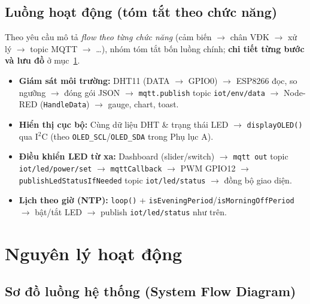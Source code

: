\documentclass[13pt,a4paper]{article}
\newcommand{\code}[1]{\texttt{#1}}
\begin{document}
\subsection{Luồng hoạt động (tóm tắt theo chức năng)}
\label{sec:tomtatluong-thietke}

Theo yêu cầu mô tả \textit{flow theo từng chức năng} (cảm biến $\rightarrow$ chân VĐK $\rightarrow$ xử lý $\rightarrow$ topic MQTT $\rightarrow$ \ldots), nhóm tóm tắt bốn luồng chính; \textbf{chi tiết từng bước và lưu đồ} ở mục~\ref{sec:nguyenly}.

\begin{itemize}
    \item \textbf{Giám sát môi trường:} DHT11 (DATA $\rightarrow$ GPIO0) $\rightarrow$ ESP8266 đọc, so ngưỡng $\rightarrow$ đóng gói JSON $\rightarrow$ \code{mqtt.publish} topic \code{iot/env/data} $\rightarrow$ Node-RED (\code{HandleData}) $\rightarrow$ gauge, chart, toast.
    \item \textbf{Hiển thị cục bộ:} Cùng dữ liệu DHT \& trạng thái LED $\rightarrow$ \code{displayOLED()} qua I$^2$C (theo \code{OLED\_SCL}/\code{OLED\_SDA} trong Phụ lục A).
    \item \textbf{Điều khiển LED từ xa:} Dashboard (slider/switch) $\rightarrow$ \code{mqtt out} topic \code{iot/led/power/set} $\rightarrow$ \code{mqttCallback} $\rightarrow$ PWM GPIO12 $\rightarrow$ \code{publishLedStatusIfNeeded} topic \code{iot/led/status} $\rightarrow$ đồng bộ giao diện.
    \item \textbf{Lịch theo giờ (NTP):} \code{loop()} + \code{isEveningPeriod}/\code{isMorningOffPeriod} $\rightarrow$ bật/tắt LED $\rightarrow$ publish \code{iot/led/status} như trên.
\end{itemize}

\section{Nguyên lý hoạt động}
\label{sec:nguyenly}

\subsection{Sơ đồ luồng hệ thống (System Flow Diagram)}
\label{sec:sodoluong}
\end{document}
